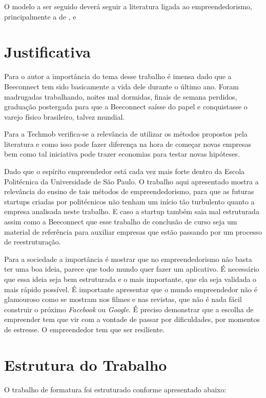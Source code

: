 O modelo a ser seguido deverá seguir a literatura ligada ao empreendedorismo, principalmente a de ,  e 

\section{Justificativa}
\label{cha:justificativa}
Para o autor a importância do tema desse trabalho é imensa dado que a Beeconnect tem sido basicamente a vida dele durante o último ano. Foram madrugadas trabalhando, noites mal dormidas, finais de semana perdidos, graduação postergada para que a Beeconnect saísse do papel e conquistasse o varejo físico brasileiro, talvez mundial.

Para a Techmob verifica-se a relevância de utilizar os métodos propostos pela literatura e como isso pode fazer diferença na hora de começar novas empresas bem como tal iniciativa pode trazer economias para testar novas hipóteses.

Dado que o espírito empreendedor está cada vez mais forte dentro da Escola Politécnica da Universidade de São Paulo. O trabalho aqui apresentado mostra a relevância do ensino de tais métodos de empreendedorismo, para que as futuras startups criadas por politécnicos não tenham um início tão turbulento quanto a empresa analisada neste trabalho. E caso a startup também saia mal estruturada assim como a Beeconnect que esse trabalho de conclusão de curso seja um material de referência para auxiliar empresas que estão passando por um processo de reestruturação.

Para a sociedade a importância é mostrar que no empreendedorismo não basta ter uma boa ideia, parece que todo mundo quer fazer um aplicativo. É necessário que essa ideia seja bem estruturada e o mais importante, que ela seja validada o mais rápido possível. É importante apresentar que o mundo empreendedor não é glamouroso como se mostram nos filmes e nas revistas, que não é nada fácil construir o próximo \textit{Facebook} ou \textit{Google}. É preciso demonstrar que a escolha de empreender tem que vir com a vontade de passar por dificuldades, por momentos de estresse. O empreendedor tem que ser resiliente. 

\section{Estrutura do Trabalho}
\label{cha:estrutura_do_trabalho}
O trabalho de formatura foi estruturado conforme apresentado abaixo:

